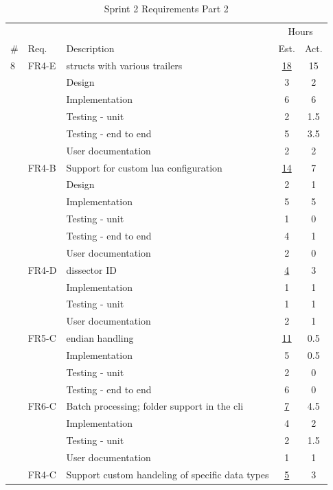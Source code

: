 \begin{table}[!htb] \small \center
\caption{Sprint 2 Requirements Part 2\label{tab:sprint2req2}}
\begin{tabularx}{\textwidth}{l l X c c}
	\toprule
	& & & \multicolumn{2}{c}{Hours} \\
	\cmidrule(r){4-5}
	\# & Req. & Description & Est. & Act. \\
	\midrule
	8 & FR4-E & \Glspl{struct} with various \gls{trailers} & \underline{ 18 } & 15 \\
	   &  & Design & 3 & 2 \\
	   &  & Implementation & 6 & 6 \\
	   &  & Testing - unit & 2 & 1.5 \\
	   &  & Testing - end to end & 5 & 3.5 \\
	   &  & User documentation & 2 & 2 \\
	\addlinespace
	9 & FR4-B & Support for custom \Gls{lua} configuration & \underline{ 14 } & 7 \\
	   &  & Design & 2 & 1 \\
	   &  & Implementation & 5 & 5 \\
	   &  & Testing - unit & 1 & 0 \\
	   &  & Testing - end to end & 4 & 1 \\
	   &  & User documentation & 2 & 0 \\
	\addlinespace
	10 & FR4-D & \Gls{dissector} ID & \underline{ 4 } & 3 \\
	   &  & Implementation & 1 & 1 \\
	   &  & Testing - unit & 1 & 1 \\
	   &  & User documentation & 2 & 1 \\
	\addlinespace
	11 & FR5-C & \Gls{endian} handling & \underline{ 11 } & 0.5 \\
	   &  & Implementation & 5 & 0.5 \\
	   &  & Testing - unit & 2 & 0 \\
	   &  & Testing - end to end & 6 & 0 \\
	\addlinespace
	12 & FR6-C & Batch processing; folder support in the \gls{cli} & \underline{ 7 } & 4.5 \\
	   &  & Implementation & 4 & 2 \\
	   &  & Testing - unit & 2 & 1.5 \\
	   &  & User documentation & 1 & 1 \\
	\addlinespace
	13 & FR4-C & Support custom handeling of specific data types & \underline{ 5 } & 3 \\

\end{tabularx}
\end{table}
